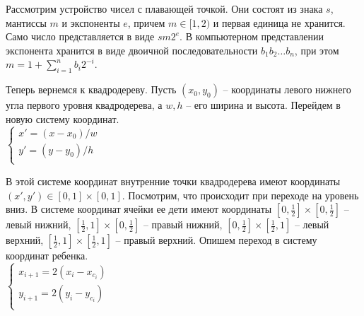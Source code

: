 Рассмотрим устройство чисел с плавающей точкой. Они состоят из знака $s$, мантиссы $m$ 
и экспоненты $e$, причем $m \in [1, 2)$ и первая единица не хранится. Само число 
представляется в виде $sm2^e$. В компьютерном представлении экспонента хранится в виде
двоичной последовательности $b_1b_2\ldots b_n$, при этом $m = 1 + \sum\limits_{i=1}^nb_i2^{-i}$.

Теперь вернемся к квадродереву. Пусть $(x_0, y_0)$ -- координаты левого нижнего угла первого уровня квадродерева, 
а $w, h$ -- его ширина и высота. Перейдем в новую систему координат.\\
$
\left\{
\begin{array}{l}
x' = (x - x_0)/w  \\
y' = (y - y_0)/h  \\
\end{array}
\right.$

В этой системе координат внутренние точки квадродерева имеют координаты
$(x', y') \in [0, 1] \times [0, 1]$. Посмотрим, что происходит при переходе на уровень вниз.
В системе координат ячейки ее дети имеют координаты $[0, \frac{1}{2}] \times [0, \frac{1}{2}]$
-- левый нижний, $[\frac{1}{2}, 1] \times [0, \frac{1}{2}]$
-- правый нижний, $[0, \frac{1}{2}] \times [\frac{1}{2}, 1]$
-- левый верхний, $[\frac{1}{2}, 1] \times [\frac{1}{2}, 1]$
-- правый верхний. Опишем переход в систему координат ребенка.\\
$
\left\{
\begin{array}{l}
x_{i+1} = 2(x_i - x_{c_i})  \\
y_{i+1} = 2(y_i - y_{c_i})  \\
\end{array}
\right.$
\\

